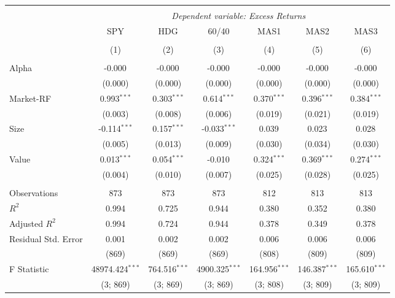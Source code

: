 \begin{table}[!htbp] \centering
\begin{tabular}{@{\extracolsep{5pt}}lcccccc}
\\[-1.8ex]\hline
\hline \\[-1.8ex]
& \multicolumn{6}{c}{\textit{Dependent variable: Excess Returns}} \
\cr \cline{2-7}
\\[-1.8ex] & \multicolumn{1}{c}{SPY} & \multicolumn{1}{c}{HDG} & \multicolumn{1}{c}{60/40} & \multicolumn{1}{c}{MAS1} & \multicolumn{1}{c}{MAS2} & \multicolumn{1}{c}{MAS3}  \\
\\[-1.8ex] & (1) & (2) & (3) & (4) & (5) & (6) \\
\hline \\[-1.8ex]
 Alpha & -0.000$^{}$ & -0.000$^{}$ & -0.000$^{}$ & -0.000$^{}$ & -0.000$^{}$ & -0.000$^{}$ \\
& (0.000) & (0.000) & (0.000) & (0.000) & (0.000) & (0.000) \\
 Market-RF & 0.993$^{***}$ & 0.303$^{***}$ & 0.614$^{***}$ & 0.370$^{***}$ & 0.396$^{***}$ & 0.384$^{***}$ \\
& (0.003) & (0.008) & (0.006) & (0.019) & (0.021) & (0.019) \\
 Size & -0.114$^{***}$ & 0.157$^{***}$ & -0.033$^{***}$ & 0.039$^{}$ & 0.023$^{}$ & 0.028$^{}$ \\
& (0.005) & (0.013) & (0.009) & (0.030) & (0.034) & (0.030) \\
 Value & 0.013$^{***}$ & 0.054$^{***}$ & -0.010$^{}$ & 0.324$^{***}$ & 0.369$^{***}$ & 0.274$^{***}$ \\
& (0.004) & (0.010) & (0.007) & (0.025) & (0.028) & (0.025) \\
\hline \\[-1.8ex]
 Observations & 873 & 873 & 873 & 812 & 813 & 813 \\
 $R^2$ & 0.994 & 0.725 & 0.944 & 0.380 & 0.352 & 0.380 \\
 Adjusted $R^2$ & 0.994 & 0.724 & 0.944 & 0.378 & 0.349 & 0.378 \\
 Residual Std. Error & 0.001 & 0.002 & 0.002 & 0.006 & 0.006 & 0.006 \\
 & (869) & (869) & (869) & (808) & (809) & (809) \\
 F Statistic & 48974.424$^{***}$ & 764.516$^{***}$ & 4900.325$^{***}$ & 164.956$^{***}$ & 146.387$^{***}$ & 165.610$^{***}$ \\
 & (3; 869) & (3; 869) & (3; 869) & (3; 808) & (3; 809) & (3; 809) \\

\end{tabular}
\end{table}
